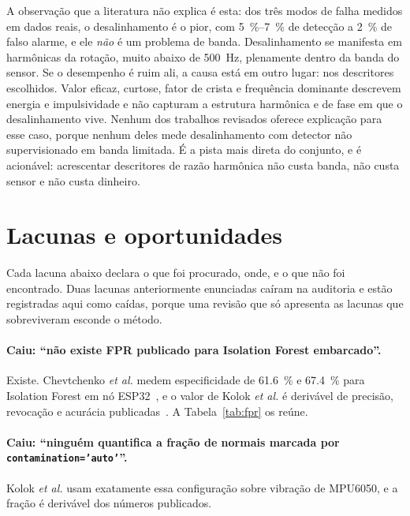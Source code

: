 \documentclass[11pt,a4paper]{article}
\begin{document}
A observação que a literatura não explica é esta: dos três modos de falha medidos em dados
reais, o desalinhamento é o pior, com \SIrange{5}{7}{\percent} de detecção a
\SI{2}{\percent} de falso alarme, e ele \emph{não} é um problema de banda. Desalinhamento
se manifesta em harmônicas da rotação, muito abaixo de \SI{500}{\hertz}, plenamente dentro
da banda do sensor. Se o desempenho é ruim ali, a causa está em outro lugar: nos
descritores escolhidos. Valor eficaz, curtose, fator de crista e frequência dominante
descrevem energia e impulsividade e não capturam a estrutura harmônica e de fase em que o
desalinhamento vive. Nenhum dos trabalhos revisados oferece explicação para esse caso,
porque nenhum deles mede desalinhamento com detector não supervisionado em banda limitada.
É a pista mais direta do conjunto, e é acionável: acrescentar descritores de razão
harmônica não custa banda, não custa sensor e não custa dinheiro.

\section{Lacunas e oportunidades}

Cada lacuna abaixo declara o que foi procurado, onde, e o que não foi encontrado. Duas
lacunas anteriormente enunciadas caíram na auditoria e estão registradas aqui como caídas,
porque uma revisão que só apresenta as lacunas que sobreviveram esconde o método.

\paragraph{Caiu: ``não existe FPR publicado para Isolation Forest embarcado''.} Existe.
Chevtchenko \emph{et al.} medem especificidade de \SI{61,6}{\percent} e
\SI{67,4}{\percent} para Isolation Forest em nó ESP32~\cite{chevtchenko2023}, e o valor de
Kolok \emph{et al.} é derivável de precisão, revocação e acurácia
publicadas~\cite{kolok2025}. A Tabela~\ref{tab:fpr} os reúne.

\paragraph{Caiu: ``ninguém quantifica a fração de normais marcada por
\texttt{contamination='auto'}''.} Kolok \emph{et al.} usam exatamente essa configuração
sobre vibração de MPU6050, e a fração é derivável dos números publicados.
\end{document}
